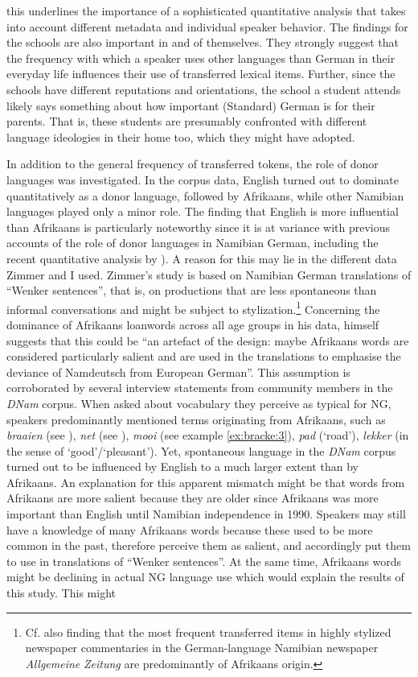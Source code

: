 \documentclass[output=paper]{langsci/langscibook}
\begin{document}
this underlines the importance of a sophisticated quantitative analysis that takes into account different metadata and individual speaker behavior. The findings for the schools are also important in and of themselves. They strongly suggest that the frequency with which a speaker uses other languages than German in their everyday life influences their use of transferred lexical items. Further, since the schools have different reputations and orientations, the school a student attends likely says something about how important (Standard) German is for their parents. That is, these students are presumably confronted with different language ideologies in their home too, which they might have adopted.

In addition to the general frequency of transferred tokens, the role of donor languages was investigated. In the corpus data, English turned out to dominate quantitatively as a donor language, followed by Afrikaans, while other Namibian languages played only a minor role. The finding that English is more influential than Afrikaans is particularly noteworthy since it is at variance with previous accounts of the role of donor languages in Namibian German, including the recent quantitative analysis by \citealt{zimmer_linguisticvar_toappear}). A reason for this may lie in the different data Zimmer and I used. Zimmer’s study is based on Namibian German translations of “Wenker sentences”, that is, on productions that are less spontaneous than informal conversations and might be subject to stylization.\footnote{Cf. also  finding that the most frequent transferred items in highly stylized newspaper commentaries in the German-language Namibian newspaper \textit{Allgemeine} \textit{Zeitung} are predominantly of Afrikaans origin.} Concerning the dominance of Afrikaans loanwords across all age groups in his data, \citet{zimmer_linguisticvar_toappear} himself suggests that this could be “an artefact of the design: maybe Afrikaans words are considered particularly salient and are used in the translations to emphasise the deviance of Namdeutsch from European German”. This assumption is corroborated by several interview statements from community members in the \textit{DNam} corpus. When asked about vocabulary they perceive as typical for NG, speakers predominantly mentioned terms originating from Afrikaans, such as \textit{braaien} (see ), \textit{net} (see ), \textit{mooi} (see example \ref{ex:bracke:3}), \textit{pad} (‘road’), \textit{lekker} (in the sense of ‘good’/‘pleasant’). Yet, spontaneous language in the \textit{DNam} corpus turned out to be influenced by English to a much larger extent than by Afrikaans. An explanation for this apparent mismatch might be that words from Afrikaans are more salient because they are older since Afrikaans was more important than English until Namibian independence in 1990. Speakers may still have a knowledge of many Afrikaans words because these used to be more common in the past, therefore perceive them as salient, and accordingly put them to use in translations of “Wenker sentences”. At the same time, Afrikaans words might be declining in actual NG language use which would explain the results of this study. This might 
\end{document}
